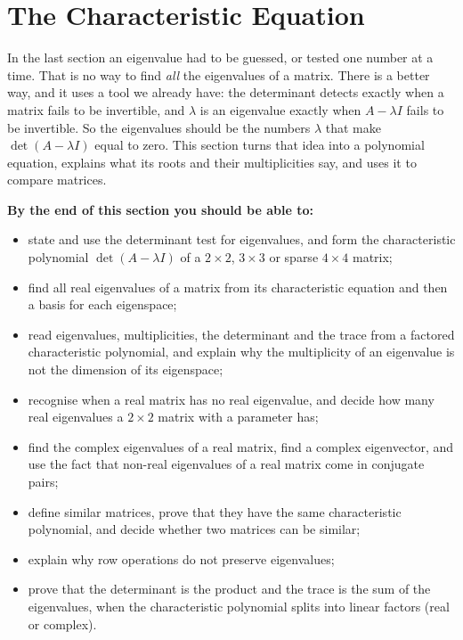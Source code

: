 \documentclass[11pt]{article}
\begin{document}
\section{The Characteristic Equation}

\begin{guide}
In the last section an eigenvalue had to be guessed, or tested one number at a time. That is no way to find \emph{all} the eigenvalues of a matrix. There is a better way, and it uses a tool we already have: the determinant detects exactly when a matrix fails to be invertible, and $\lambda$ is an eigenvalue exactly when $A-\lambda I$ fails to be invertible. So the eigenvalues should be the numbers $\lambda$ that make $\det(A-\lambda I)$ equal to zero. This section turns that idea into a polynomial equation, explains what its roots and their multiplicities say, and uses it to compare matrices.
\end{guide}

\textbf{By the end of this section you should be able to:}
\begin{itemize}
  \item state and use the determinant test for eigenvalues, and form the characteristic polynomial $\det(A-\lambda I)$ of a $2\times2$, $3\times3$ or sparse $4\times4$ matrix;
  \item find all real eigenvalues of a matrix from its characteristic equation and then a basis for each eigenspace;
  \item read eigenvalues, multiplicities, the determinant and the trace from a factored characteristic polynomial, and explain why the multiplicity of an eigenvalue is not the dimension of its eigenspace;
  \item recognise when a real matrix has no real eigenvalue, and decide how many real eigenvalues a $2\times2$ matrix with a parameter has;
  \item find the complex eigenvalues of a real matrix, find a complex eigenvector, and use the fact that non-real eigenvalues of a real matrix come in conjugate pairs;
  \item define similar matrices, prove that they have the same characteristic polynomial, and decide whether two matrices can be similar;
  \item explain why row operations do not preserve eigenvalues;
  \item prove that the determinant is the product and the trace is the sum of the eigenvalues, when the characteristic polynomial splits into linear factors (real or complex).
\end{itemize}
\end{document}

